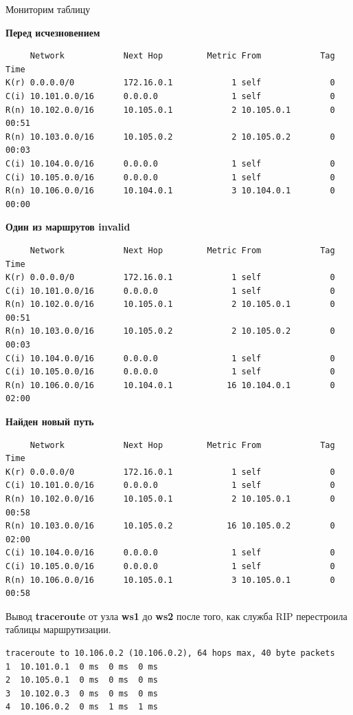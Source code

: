 \documentclass[a4paper,12pt]{article}
\begin{document}
Мониторим таблицу

\textbf{Перед исчезновением}
\begin{verbatim}
     Network            Next Hop         Metric From            Tag Time
K(r) 0.0.0.0/0          172.16.0.1            1 self              0
C(i) 10.101.0.0/16      0.0.0.0               1 self              0
R(n) 10.102.0.0/16      10.105.0.1            2 10.105.0.1        0 00:51
R(n) 10.103.0.0/16      10.105.0.2            2 10.105.0.2        0 00:03
C(i) 10.104.0.0/16      0.0.0.0               1 self              0
C(i) 10.105.0.0/16      0.0.0.0               1 self              0
R(n) 10.106.0.0/16      10.104.0.1            3 10.104.0.1        0 00:00
\end{verbatim}

\textbf{Один из маршрутов invalid}
\begin{verbatim}
     Network            Next Hop         Metric From            Tag Time
K(r) 0.0.0.0/0          172.16.0.1            1 self              0
C(i) 10.101.0.0/16      0.0.0.0               1 self              0
R(n) 10.102.0.0/16      10.105.0.1            2 10.105.0.1        0 00:51
R(n) 10.103.0.0/16      10.105.0.2            2 10.105.0.2        0 00:03
C(i) 10.104.0.0/16      0.0.0.0               1 self              0
C(i) 10.105.0.0/16      0.0.0.0               1 self              0
R(n) 10.106.0.0/16      10.104.0.1           16 10.104.0.1        0 02:00
\end{verbatim}

\textbf{Найден новый путь}
\begin{verbatim}
     Network            Next Hop         Metric From            Tag Time
K(r) 0.0.0.0/0          172.16.0.1            1 self              0
C(i) 10.101.0.0/16      0.0.0.0               1 self              0
R(n) 10.102.0.0/16      10.105.0.1            2 10.105.0.1        0 00:58
R(n) 10.103.0.0/16      10.105.0.2           16 10.105.0.2        0 02:00
C(i) 10.104.0.0/16      0.0.0.0               1 self              0
C(i) 10.105.0.0/16      0.0.0.0               1 self              0
R(n) 10.106.0.0/16      10.105.0.1            3 10.105.0.1        0 00:58
\end{verbatim}
     
Вывод \textbf{traceroute} от узла \textbf{ws1} до \textbf{ws2} после того, как служба RIP перестроила таблицы маршрутизации.
\begin{Verbatim}
traceroute to 10.106.0.2 (10.106.0.2), 64 hops max, 40 byte packets
1  10.101.0.1  0 ms  0 ms  0 ms
2  10.105.0.1  0 ms  0 ms  0 ms
3  10.102.0.3  0 ms  0 ms  0 ms
4  10.106.0.2  0 ms  1 ms  1 ms
\end{Verbatim}
\end{document}
